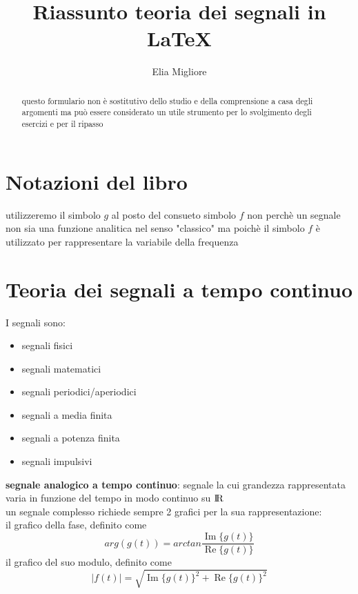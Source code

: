 \documentclass{article}
\begin{document}
\title{Riassunto teoria dei segnali in \LaTeX{}}
\author{Elia Migliore}

\maketitle

\begin{abstract}
questo formulario non è sostitutivo dello studio e della
comprensione a casa degli argomenti ma può essere considerato
un utile strumento per lo svolgimento degli esercizi e per il ripasso
\end{abstract}

\section{Notazioni del libro}
utilizzeremo il simbolo $g$ al posto del consueto simbolo $f$ non perchè un segnale non sia una funzione analitica nel senso "classico" ma poichè il simbolo $f$ è utilizzato per rappresentare la variabile della frequenza


\section{Teoria dei segnali a tempo continuo}
I segnali sono:
\begin{itemize}
\item segnali fisici
\item segnali matematici
\item segnali periodici/aperiodici
\item segnali a media finita
\item segnali a potenza finita
\item segnali impulsivi
\end{itemize}

\textbf{segnale analogico a tempo continuo}: segnale la cui grandezza rappresentata varia
in funzione del tempo in modo continuo su $\rm I\!R$\\

\endp
un segnale complesso richiede sempre 2 grafici per la sua rappresentazione:\\
il grafico della fase, definito come
$$arg(g(t)) = arctan{\frac{\operatorname{Im}\{g(t)\}}{\operatorname{Re}\{g(t)\}}}$$
il grafico del suo modulo, definito come
$$|f(t)| = \sqrt{\operatorname{Im}\{g(t)\}^2+{\operatorname{Re}\{g(t)\}^2}}$$
\end{document}
